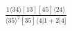 \documentclass[varwidth, border=5pt]{standalone}
\begin{document}
\begin{my}
$\begin{gathered}
\scriptscriptstyle\frac{1⟨34⟩[13][45]⟨24⟩}{⟨35⟩^2[35]⟨4|1+2|4]}
\end{gathered}$
\end{my}
\end{document}
